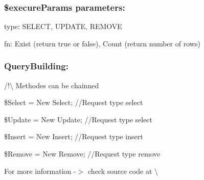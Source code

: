 \subsubsection*{\$execure\+Params parameters\+:}


\begin{DoxyItemize}
\item type\+: {\ttfamily S\+E\+L\+E\+CT, U\+P\+D\+A\+TE, R\+E\+M\+O\+VE}
\item fn\+: {\ttfamily Exist (return true or false), Count (return number of rows)}
\end{DoxyItemize}

\subsubsection*{Query\+Building\+:}

/!\textbackslash{} Methodes can be chainned
\begin{DoxyItemize}
\item {\ttfamily \$\+Select = New Select; //\+Request type select}
\item {\ttfamily \$\+Update = New Update; //\+Request type select}
\item {\ttfamily \$\+Insert = New Insert; //\+Request type insert}
\item {\ttfamily \$\+Remove = New Remove; //\+Request type remove}
\item For more information -\/$>$ check source code at \textbackslash{} 
\end{DoxyItemize}